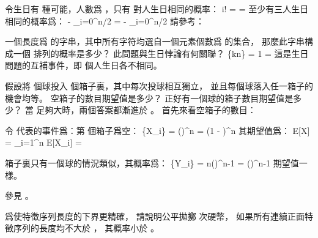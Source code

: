 \startANSWER
令生日有  種可能，人數爲 ，只有  對人生日相同的概率：
\startformula\startmathalignment
\NC \NC
{}
     {i!} \NR
\NC \NC \qquad {}  \cdots {} \NR
\NC = \NC {}
           \NR
\NC = \NC {} \NR
\stopmathalignment\stopformula
至少有三人生日相同的概率爲：
\startformula\startmathalignment
\NC {} - \sum_{i=0}^{\lfloor n/2\rfloor} \NR
\NC =  - \sum_{i=0}^{\lfloor n/2\rfloor}
               \NR
\stopmathalignment\stopformula
請參考：
\stopANSWER

\startEXERCISE \DIFFICULT
一個長度爲  的字串，其中所有字符均選自一個元素個數爲  的集合，
那麼此字串構成一個  排列的概率是多少？
此問題與生日悖論有何關聯？
\stopEXERCISE
\startANSWER
\startformula
\Pr\{kn\} = 1 \cdot
                                  \cdot
                                  \cdots
      = 
\stopformula
這是生日問題的互補事件，即  個人生日各不相同。
\stopANSWER

\startEXERCISE \DIFFICULT
假設將  個球投入  個箱子裏，其中每次投球相互獨立，
並且每個球落入任一箱子的機會均等。
空箱子的數目期望值是多少？
正好有一個球的箱子數目期望值是多少？
\stopEXERCISE
\startANSWER
當  足夠大時，兩個答案都漸進於 。
首先來看空箱子的數目：

令  代表的事件爲：第  個箱子爲空：
\startformula
\Pr\{X_i\} = \left(\right)^n
                = \left(1 - \right)^n
                \approx {}
\stopformula
其期望值爲：
\startformula
E[X] = \sum_{i=1}^n E[X_i] = 
\stopformula

箱子裏只有一個球的情況類似，其概率爲：
\startformula
\Pr\{Y_i\} = n\left(\right)^{n-1}
                = \left(\right)^{n-1} \approx {}
\stopformula
期望值一樣。

參見 。
\stopANSWER

\startEXERCISE \DIFFICULT
爲使特徵序列長度的下界更精確，
請說明公平拋擲  次硬幣，
如果所有連續正面特徵序列的長度均不大於 ，
其概率小於 。
\stopEXERCISE

\startANSWER
{}
\stopANSWER

\stopsection
